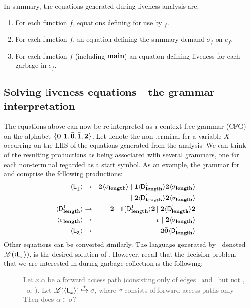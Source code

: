 \documentclass[preprint, 9pt]{sigplanconf}
\begin{document}
In  summary, the  equations  generated during  liveness
analysis are:
\begin{enumerate}
\item   For  each   function  $\mathit{f}$,   equations
  defining  for use by \Lfonly$_{\mathit f}$.
\item For each function $\mathit{f}$, an equation defining the summary
  demand $\sigma_{\mathit f}$ on $e_f$.
\item   For  each   function  $\mathit{f}$   (including
  $\mathbf{main}$) an  equation  defining
  liveness for each garbage in  $e_{\mathit f}$.
\end{enumerate}
\subsection{Solving liveness equations---the grammar
interpretation}\label{sec:grammar-formulation}      The
equations  above   can  now  be  re-interpreted   as  a
context-free    grammar   (CFG)    on   the    alphabet
$\lbrace\mathbf{0},  \mathbf{1},  \bar{\mathbf{0}},  \bar{\mathbf{1}},  {\mathbf{2}}\rbrace$.
Let   denote the  non-terminal for  a variable
$X$  occurring on  the LHS  of the  equations generated
from  the  analysis.  We  can  think  of the  resulting
productions as being  associated with several grammars,
one for each non-terminal  regarded as
a  start  symbol.   As  an  example,  the  grammar  for
\var{\Lanv{\xl}{}} and \var{\Lanv{\pa}{}}    comprise     the     following
productions:
\begin{eqnarray*}
  \langle \mathsf{L}_{{\mbox{\tt l}}}^{}\rangle  &\rightarrow& 
  {\mathbf{2}}\langle \sigma_{\mathbf{length}}\rangle \mid \mathbf{1} \langle \mathsf{D}_{\mathit {\mathbf{length}}}^{1}\rangle{\ensuremath{{\mathbf{2}}}\ensuremath{\langle \sigma_{\mathbf{length}}\rangle}}  \\
  & & \mid
  {\mathbf{2}}\langle \mathsf{D}_{\mathit {\mathbf{length}}}^{1}\rangle{\ensuremath{{\mathbf{2}}}\ensuremath{\langle \sigma_{\mathbf{length}}\rangle}} \\
  \langle \mathsf{D}_{\mathit {\mathbf{length}}}^{1}\rangle &\rightarrow& {\mathbf{2}} \mid
  \mathbf{1}\langle \mathsf{D}_{\mathit {\mathbf{length}}}^{1}\rangle{\mathbf{2}}
       \mid {\mathbf{2}}\langle \mathsf{D}_{\mathit {\mathbf{length}}}^{1}\rangle{\ensuremath{{\mathbf{2}}}}\\
\langle {\sigma_{\ensuremath{\mathbf{length}}}} \rangle
&\rightarrow&
\epsilon  \mid {\mathbf{2}}\langle{\sigma_{\ensuremath{\mathbf{length}}}}\rangle \\
\langle \mathsf{L}_{{\mbox{\tt a}}}^{}\rangle &\rightarrow& {\mathbf{2}} \bar{\mathbf{0}} \langle \mathsf{D}_{\mathit {\mathbf{length}}}^{1}\rangle
\end{eqnarray*}
Other  equations  can   be  converted  similarly.   The
language   generated   by  ,   denoted
$\mathscr{L}(\langle \mathsf{L}_{{x}}^{}\rangle)$,   is    the   desired
solution  of  .    
However, recall that the decision problem that we are interested in
during garbage collection is the following: 
\begin{quote}
Let $x.\alpha$ be a forward access path (consisting only
of edges  \acar\ and \acdr\  but not \bcar,  \bcdr\ or
\clazy).       Let      $\mathscr{L}(\langle \mathsf{L}_{{x}}^{}\rangle)
\stackrel{*}{\hookrightarrow}  \sigma$, where  $\sigma$
consists  of  forward  access  paths  only.  Then  does
$\alpha \in \sigma$?
\end{quote}
\end{document}
